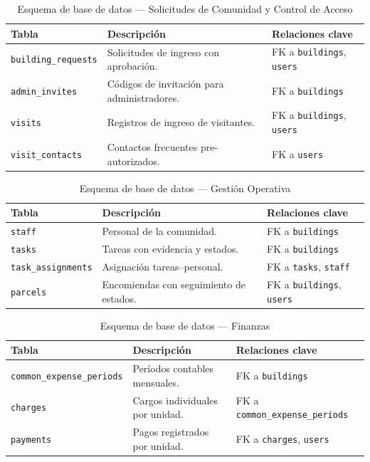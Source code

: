 \begin{table}[H]
\centering
\caption{Esquema de base de datos --- Solicitudes de Comunidad y Control de Acceso}\label{tab:esquema-solicitudes}
\begin{tabular}{|p{}|p{}|p{}|}
\hline
\textbf{Tabla} & \textbf{Descripción} & \textbf{Relaciones clave} \\
\hline
\texttt{building\_requests} & Solicitudes de ingreso con aprobación. & FK a \texttt{buildings}, \texttt{users} \\
\hline
\texttt{admin\_invites} & Códigos de invitación para administradores. & FK a \texttt{buildings} \\
\hline
\texttt{visits} & Registros de ingreso de visitantes. & FK a \texttt{buildings}, \texttt{users} \\
\hline
\texttt{visit\_contacts} & Contactos frecuentes pre-autorizados. & FK a \texttt{users} \\
\hline
\end{tabular}
\end{table}

\begin{table}[H]
\centering
\caption{Esquema de base de datos --- Gestión Operativa}\label{tab:esquema-operativa}
\begin{tabular}{|p{}|p{}|p{}|}
\hline
\textbf{Tabla} & \textbf{Descripción} & \textbf{Relaciones clave} \\
\hline
\texttt{staff} & Personal de la comunidad. & FK a \texttt{buildings} \\
\hline
\texttt{tasks} & Tareas con evidencia y estados. & FK a \texttt{buildings} \\
\hline
\texttt{task\_assignments} & Asignación tareas--personal. & FK a \texttt{tasks}, \texttt{staff} \\
\hline
\texttt{parcels} & Encomiendas con seguimiento de estados. & FK a \texttt{buildings}, \texttt{users} \\
\hline
\end{tabular}
\end{table}

\begin{table}[H]
\centering
\caption{Esquema de base de datos --- Finanzas}\label{tab:esquema-finanzas}
\begin{tabular}{|p{}|p{}|p{}|}
\hline
\textbf{Tabla} & \textbf{Descripción} & \textbf{Relaciones clave} \\
\hline
\texttt{common\_expense\_periods} & Períodos contables mensuales. & FK a \texttt{buildings} \\
\hline
\texttt{charges} & Cargos individuales por unidad. & FK a \texttt{common\_expense\_periods} \\
\hline
\texttt{payments} & Pagos registrados por unidad. & FK a \texttt{charges}, \texttt{users} \\
\hline
\end{tabular}
\end{table}

